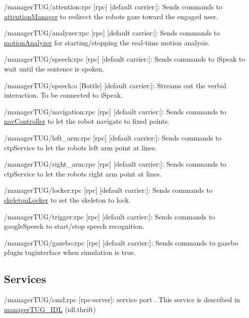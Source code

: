 \begin{DoxyItemize}
\item /manager\+T\+U\+G/attention\+:rpc \mbox{[}rpc\mbox{]} \mbox{[}default carrier\+:\mbox{]}\+: Sends commands to \hyperlink{group__attentionManager}{attention\+Manager} to redirect the robot\textquotesingle{}s gaze toward the engaged user.
\item /manager\+T\+U\+G/analyzer\+:rpc \mbox{[}rpc\mbox{]} \mbox{[}default carrier\+:\mbox{]}\+: Sends commands to \hyperlink{group__motionAnalyzer}{motion\+Analyzer} for starting/stopping the real-\/time motion analysis.
\item /manager\+T\+U\+G/speech\+:rpc \mbox{[}rpc\mbox{]} \mbox{[}default carrier\+:\mbox{]}\+: Sends commands to i\+Speak to wait until the sentence is spoken.
\item /manager\+T\+U\+G/speech\+:o \mbox{[}Bottle\mbox{]} \mbox{[}default carrier\+:\mbox{]}\+: Streams out the verbal interaction. To be connected to i\+Speak.
\item /manager\+T\+U\+G/navigation\+:rpc \mbox{[}rpc\mbox{]} \mbox{[}default carrier\+:\mbox{]}\+: Sends commands to \hyperlink{group__navController}{nav\+Controller} to let the robot navigate to fixed points.
\item /manager\+T\+U\+G/left\+\_\+arm\+:rpc \mbox{[}rpc\mbox{]} \mbox{[}default carrier\+:\mbox{]}\+: Sends commands to ctp\+Service to let the robot\textquotesingle{}s left arm point at lines.
\item /manager\+T\+U\+G/right\+\_\+arm\+:rpc \mbox{[}rpc\mbox{]} \mbox{[}default carrier\+:\mbox{]}\+: Sends commands to ctp\+Service to let the robot\textquotesingle{}s right arm point at lines.
\item /manager\+T\+U\+G/locker\+:rpc \mbox{[}rpc\mbox{]} \mbox{[}default carrier\+:\mbox{]}\+: Sends commands to \hyperlink{group__skeletonLocker}{skeleton\+Locker} to set the skeleton to lock.
\item /manager\+T\+U\+G/trigger\+:rpc \mbox{[}rpc\mbox{]} \mbox{[}default carrier\+:\mbox{]}\+: Sends commands to google\+Speech to start/stop speech recognition.
\item /manager\+T\+U\+G/gazebo\+:rpc \mbox{[}rpc\mbox{]} \mbox{[}default carrier\+:\mbox{]}\+: Sends commands to gazebo plugin tuginterface when simulation is true.
\end{DoxyItemize}\hypertarget{group__skeletonViewer_services_sec}{}\subsection{Services}\label{group__skeletonViewer_services_sec}

\begin{DoxyItemize}
\item /manager\+T\+U\+G/cmd\+:rpc \mbox{[}rpc-\/server\mbox{]}\+: service port . This service is described in \hyperlink{classmanagerTUG__IDL}{manager\+T\+U\+G\+\_\+\+I\+DL} (idl.\+thrift) 
\end{DoxyItemize}
